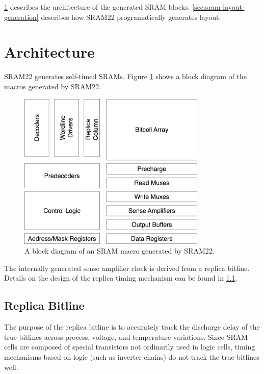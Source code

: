 \ref{sec:sram-architecture} describes the architecture of the generated SRAM blocks.
\ref{sec:sram-layout-generation} describes how SRAM22 programatically generates layout.

\section{Architecture} \label{sec:sram-architecture}

SRAM22 generates self-timed SRAMs. Figure \ref{fig:sram22-block-diagram} shows a block diagram
of the macros generated by SRAM22.

\begin{figure}[H] \centering
\includegraphics[width=0.8\textwidth]{figures/sram22_block_diagram.png}
\caption{A block diagram of an SRAM macro generated by SRAM22. \label{fig:sram22-block-diagram}}
\end{figure}

The internally generated sense amplifier clock is derived
from a replica bitline. Details on the design of the replica timing mechanism can be found in \ref{sec:replica-bitline}.

\subsection{Replica Bitline} \label{sec:replica-bitline}

The purpose of the replica bitline is to accurately track the discharge delay of the true bitlines across
process, voltage, and temperature variations. Since SRAM cells are composed of special transistors
not ordinarily used in logic cells, timing mechanisms based on logic (such as inverter chains) do not
track the true bitlines well.

